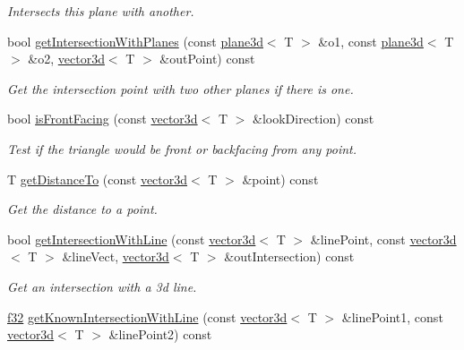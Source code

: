 \begin{DoxyCompactItemize}
\begin{DoxyCompactList}\small\item\em Intersects this plane with another. \end{DoxyCompactList}\item 
\mbox{\label{classirr_1_1core_1_1plane3d_aa211e140706ba340cc413e1dfc095efd}} 
bool \hyperlink{classirr_1_1core_1_1plane3d_aa211e140706ba340cc413e1dfc095efd}{get\+Intersection\+With\+Planes} (const \hyperlink{classirr_1_1core_1_1plane3d}{plane3d}$<$ T $>$ \&o1, const \hyperlink{classirr_1_1core_1_1plane3d}{plane3d}$<$ T $>$ \&o2, \hyperlink{classirr_1_1core_1_1vector3d}{vector3d}$<$ T $>$ \&out\+Point) const
\begin{DoxyCompactList}\small\item\em Get the intersection point with two other planes if there is one. \end{DoxyCompactList}\item 
bool \hyperlink{classirr_1_1core_1_1plane3d_aca0237b25cbf4fe13d87b14a04d68df9}{is\+Front\+Facing} (const \hyperlink{classirr_1_1core_1_1vector3d}{vector3d}$<$ T $>$ \&look\+Direction) const
\begin{DoxyCompactList}\small\item\em Test if the triangle would be front or backfacing from any point. \end{DoxyCompactList}\item 
T \hyperlink{classirr_1_1core_1_1plane3d_ab5e41d5843bf3bb856f543186b8a7df8}{get\+Distance\+To} (const \hyperlink{classirr_1_1core_1_1vector3d}{vector3d}$<$ T $>$ \&point) const
\begin{DoxyCompactList}\small\item\em Get the distance to a point. \end{DoxyCompactList}\item 
bool \hyperlink{classirr_1_1core_1_1plane3d_ae3fb02f09788ead8b36523891fbd1288}{get\+Intersection\+With\+Line} (const \hyperlink{classirr_1_1core_1_1vector3d}{vector3d}$<$ T $>$ \&line\+Point, const \hyperlink{classirr_1_1core_1_1vector3d}{vector3d}$<$ T $>$ \&line\+Vect, \hyperlink{classirr_1_1core_1_1vector3d}{vector3d}$<$ T $>$ \&out\+Intersection) const
\begin{DoxyCompactList}\small\item\em Get an intersection with a 3d line. \end{DoxyCompactList}\item 
\hyperlink{namespaceirr_a0277be98d67dc26ff93b1a6a1d086b07}{f32} \hyperlink{classirr_1_1core_1_1plane3d_a5fcd4852c2634172862324340558c634}{get\+Known\+Intersection\+With\+Line} (const \hyperlink{classirr_1_1core_1_1vector3d}{vector3d}$<$ T $>$ \&line\+Point1, const \hyperlink{classirr_1_1core_1_1vector3d}{vector3d}$<$ T $>$ \&line\+Point2) const

\end{DoxyCompactItemize}
